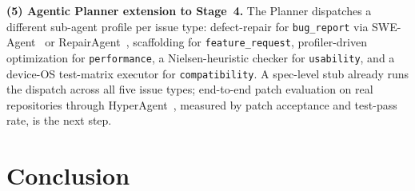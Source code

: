 \documentclass[preprint,12pt]{elsarticle}
\begin{document}
\textbf{(5) Agentic Planner extension to Stage~4.} The Planner dispatches a different
  sub-agent profile per issue type: defect-repair for \texttt{bug\_report} via
  SWE-Agent~\cite{yang2024swe} or RepairAgent~\cite{bouzenia2025repairagent}, scaffolding
  for \texttt{feature\_request}, profiler-driven optimization for \texttt{performance}, a
  Nielsen-heuristic checker for \texttt{usability}, and a device-OS test-matrix executor for
  \texttt{compatibility}. A spec-level stub already runs the dispatch across all five issue
  types; end-to-end patch evaluation on real repositories through
  HyperAgent~\cite{phan2024hyperagent}, measured by patch acceptance and test-pass rate, is the
  next step.

\section{Conclusion}\label{conclusion}
\end{document}
